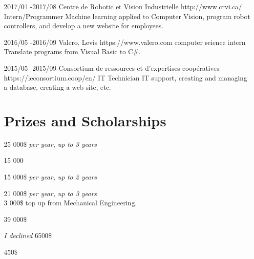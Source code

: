 \documentclass[10pt]{article} %
\begin{document}

\job
{2017/01 -}{2017/08}
{Centre de Robotic et Vision Industrielle}
{http://www.crvi.ca/}
{Intern/Programmer}
{Machine learning applied to Computer Vision, program robot controllers, and develop a new website for employees.}

\job
{2016/05 -}{2016/09}
{Valero, Levis}
{https://www.valero.com}
{computer science intern}
{Translate programs from Visual Basic to C\#.}

\job
{2015/05 -}{2015/09}
{Consortium de ressources et d'expertises coopératives}
{https://leconsortium.coop/en/}
{IT Technician}
{IT support, creating and managing a database, creating a web site, etc.}


\section{Prizes and Scholarships}

{
 25 000\$ \textit{per year, up to 3 years} \\
}

{
 15 000 \\
}

{
 15 000\$ \textit{per year, up to 2 years} \\
}

{
 21 000\$ \textit{per year, up to 3 years} \\
 3 000\$ top up from Mechanical Engineering.\\
}

{
\textit{} 39 000\$\\
}

{
\textit{I declined} 6500\$\\
}

{
\textit{} 450\$\\
}
\end{document}
